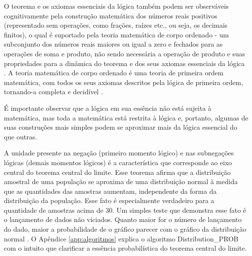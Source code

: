 O teorema e os axiomas essenciais da lógica também podem ser observáveis cognitivamente pela construção matemática dos números reais positivos (representado sem operações, como frações, raízes etc., ou seja, os decimais finitos), o qual é suportado pela teoria matemática de corpo ordenado - um subconjunto dos números reais maiores ou igual a zero e fechados para as operações de soma e produto, não sendo necessária a operação de produto e suas propriedades para a dinâmica do teorema e dos seus axiomas essenciais da lógica \cite{wiki_CorpoOrdenado}. A teoria matemática de corpo ordenado é uma teoria de primeira ordem matemática, com todos os seus axiomas descritos pela lógica de primeira ordem, tornando-a completa e decidível \cite{wiki_RealClosedField}. 

É importante observar que a lógica em sua essência não está sujeita à matemática, mas toda a matemática está restrita à lógica e, portanto, algumas de suas construções mais simples podem se aproximar mais da lógica essencial do que outras.

A unidade presente na negação (primeiro momento lógico) e nas subnegações lógicas (demais momentos lógicos) é a característica que corresponde ao eixo central do teorema central do limite. Esse teorema afirma que a distribuição amostral de uma população se aproxima de uma distribuição normal à medida que as quantidades das amostras aumentam, independente da forma da distribuição da população. Esse fato é especialmente verdadeiro para a quantidade de amostras acima de 30. Um simples teste que demonstra esse fato é o lançamento de dados não viciados. Quanto maior for o número de lançamento do dado, maior a probabilidade de o gráfico parecer com o gráfico da distribuição normal \cite{statisticshowto_teorema_central_limite}. O Apêndice \ref{app:algoritmos} explica o algoritmo Distribution\_PROB com o intuito que clarificar a essência probabilística do teorema central do limite.

